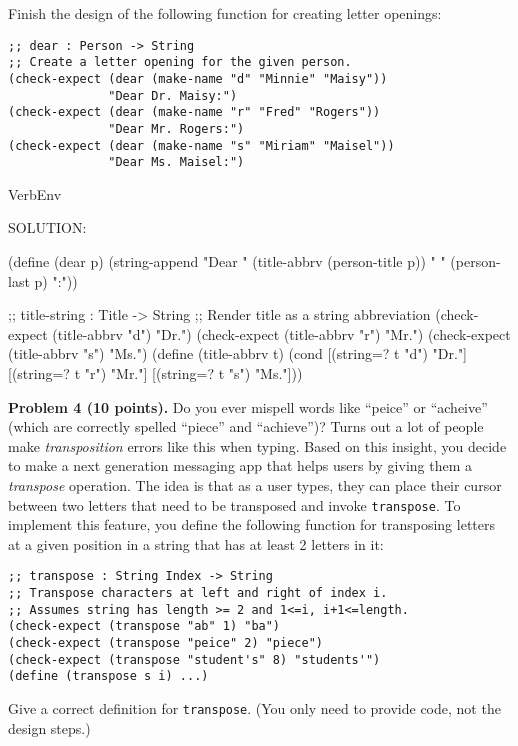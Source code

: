 \documentclass[12pt]{article}
\begin{document}
\noindent
Finish the design of the following function for creating letter
openings:
\begin{verbatim}
;; dear : Person -> String
;; Create a letter opening for the given person.
(check-expect (dear (make-name "d" "Minnie" "Maisy"))
              "Dear Dr. Maisy:")
(check-expect (dear (make-name "r" "Fred" "Rogers"))
              "Dear Mr. Rogers:")
(check-expect (dear (make-name "s" "Miriam" "Maisel"))
              "Dear Ms. Maisel:")
\end{verbatim}


\begin{SaveVerbatim}{VerbEnv}

SOLUTION:

(define (dear p)
  (string-append "Dear " 
                 (title-abbrv (person-title p)) 
                 " " 
                 (person-last p) 
                 ":"))

;; title-string : Title -> String
;; Render title as a string abbreviation
(check-expect (title-abbrv "d") "Dr.")
(check-expect (title-abbrv "r") "Mr.")
(check-expect (title-abbrv "s") "Ms.")
(define (title-abbrv t)
  (cond [(string=? t "d") "Dr."]
        [(string=? t "r") "Mr."]
        [(string=? t "s") "Ms."]))
\end{SaveVerbatim}


\newpage
\noindent
{\bf Problem 4 (10 points).}
%
Do you ever mispell words like ``peice'' or ``acheive'' (which are
correctly spelled ``piece'' and ``achieve'')?  Turns out a lot of
people make \emph{transposition} errors like this when typing.  Based
on this insight, you decide to make a next generation messaging app
that helps users by giving them a \emph{transpose} operation.  The
idea is that as a user types, they can place their cursor between two
letters that need to be transposed and invoke {\tt transpose}.  To
implement this feature, you define the following function for
transposing letters at a given position in a string that has at
least 2 letters in it:
\begin{verbatim}
;; transpose : String Index -> String
;; Transpose characters at left and right of index i.
;; Assumes string has length >= 2 and 1<=i, i+1<=length.
(check-expect (transpose "ab" 1) "ba")
(check-expect (transpose "peice" 2) "piece")
(check-expect (transpose "student's" 8) "students'")
(define (transpose s i) ...)
\end{verbatim}

\noindent
Give a correct definition for \verb|transpose|.  (You only need to
provide code, not the design steps.)
\end{document}
